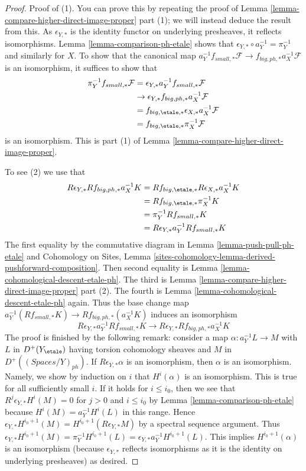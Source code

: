 \begin{proof}
Proof of (1). You can prove this by repeating the proof of
Lemma \ref{lemma-compare-higher-direct-image-proper} part (1);
we will instead deduce the result from this.
As $\epsilon_{Y, *}$ is the identity functor on underlying presheaves,
it reflects isomorphisms. Lemma \ref{lemma-comparison-ph-etale}
shows that $\epsilon_{Y, *} \circ a_Y^{-1} = \pi_Y^{-1}$
and similarly for $X$. To show that the canonical map
$a_Y^{-1}f_{small, *}\mathcal{F} \to f_{big, ph, *}a_X^{-1}\mathcal{F}$
is an isomorphism, it suffices to show that
\begin{align*}
\pi_Y^{-1}f_{small, *}\mathcal{F}
& =
\epsilon_{Y, *}a_Y^{-1}f_{small, *}\mathcal{F} \\
& \to 
\epsilon_{Y, *}f_{big, ph, *}a_X^{-1}\mathcal{F} \\
& =
f_{big, \etale, *} \epsilon_{X, *}a_X^{-1}\mathcal{F} \\
& =
f_{big, \etale, *}\pi_X^{-1}\mathcal{F}
\end{align*}
is an isomorphism. This is part
(1) of Lemma \ref{lemma-compare-higher-direct-image-proper}.

\medskip\noindent
To see (2) we use that
\begin{align*}
R\epsilon_{Y, *}Rf_{big, ph, *}a_X^{-1}K
& =
Rf_{big, \etale, *}R\epsilon_{X, *}a_X^{-1}K \\
& =
Rf_{big, \etale, *}\pi_X^{-1}K \\
& =
\pi_Y^{-1}Rf_{small, *}K \\
& =
R\epsilon_{Y, *} a_Y^{-1}Rf_{small, *}K
\end{align*}
The first equality by the commutative diagram in
Lemma \ref{lemma-push-pull-ph-etale}
and Cohomology on Sites, Lemma
\ref{sites-cohomology-lemma-derived-pushforward-composition}.
Then second equality is Lemma \ref{lemma-cohomological-descent-etale-ph}.
The third is
Lemma \ref{lemma-compare-higher-direct-image-proper} part (2).
The fourth is Lemma \ref{lemma-cohomological-descent-etale-ph} again.
Thus the base change map
$a_Y^{-1}(Rf_{small, *}K) \to Rf_{big, ph, *}(a_X^{-1}K)$
induces an isomorphism
$$
R\epsilon_{Y, *}a_Y^{-1}Rf_{small, *}K \to
R\epsilon_{Y, *}Rf_{big, ph, *}a_X^{-1}K
$$
The proof is finished by the following remark: consider a map
$\alpha : a_Y^{-1}L \to M$ with $L$ in $D^+(Y_\etale)$
having torsion cohomology sheaves
and $M$ in $D^+((\textit{Spaces}/Y)_{ph})$. If
$R\epsilon_{Y, *}\alpha$ is an isomorphism, then $\alpha$ is an isomorphism.
Namely, we show by induction on $i$ that $H^i(\alpha)$ is an isomorphism.
This is true for all sufficiently small $i$.
If it holds for $i \leq i_0$, then we see that
$R^j\epsilon_{Y, *}H^i(M) = 0$ for $j > 0$ and $i \leq i_0$
by Lemma \ref{lemma-comparison-ph-etale}
because $H^i(M) = a_Y^{-1}H^i(L)$ in this range.
Hence $\epsilon_{Y, *}H^{i_0 + 1}(M) = H^{i_0 + 1}(R\epsilon_{Y, *}M)$
by a spectral sequence argument.
Thus $\epsilon_{Y, *}H^{i_0 + 1}(M) = \pi_Y^{-1}H^{i_0 + 1}(L) =
\epsilon_{Y, *}a_Y^{-1}H^{i_0 + 1}(L)$.
This implies $H^{i_0 + 1}(\alpha)$ is an isomorphism
(because $\epsilon_{Y, *}$ reflects isomorphisms as it is the
identity on underlying presheaves) as desired.
\end{proof}



















